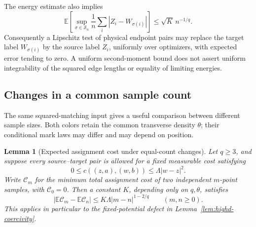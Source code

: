 \documentclass[11pt,reqno]{amsart}
\newtheorem{lemma}[theorem]{Lemma}
\theoremstyle{definition}
\theoremstyle{remark}
\numberwithin{equation}{section}
\newcommand{\E}{\mathbb E}
\begin{document}
The energy estimate also implies
\begin{equation}
\E\!\left[\sup_{\sigma\in\mathcal S_n}
 \frac1n\sum_i|Z_i-W_{\sigma(i)}|\right]
 \le\sqrt K\,n^{-1/q}.
\label{eq:highd-macro-collapse}
\end{equation}
Consequently a Lipschitz test of physical endpoint pairs may replace
the target label \(W_{\sigma(i)}\) by the source label \(Z_i\),
uniformly over optimizers, with expected error tending to zero.
A uniform second-moment bound does not assert uniform integrability
of the squared edge lengths or equality of limiting energies.

\subsection{Changes in a common sample count}
\label{subsec:highd-balanced-count}

The same squared-matching input gives a useful comparison between
different sample sizes. Both colors retain the common transverse
density \(\theta\); their conditional mark laws may differ and
may depend on position.

\begin{lemma}[Expected assignment cost under equal-count changes]
\label{lem:highd-count-continuity}
Let \(q\ge3\), and suppose every source--target pair is allowed
for a fixed measurable cost satisfying
\[
0\le c((z,a),(w,b))\le\Lambda|w-z|^2.
\]
Write \(\mathcal C_m\) for the minimum total assignment cost of
two independent \(m\)-point samples, with \(\mathcal C_0=0\).
Then a constant \(K\), depending only on \(q,\theta\), satisfies
\[
\big|\E\mathcal C_m-\E\mathcal C_n\big|
 \le K\Lambda|m-n|^{1-2/q}
\qquad(m,n\ge0).
\]
This applies in particular to the fixed-potential defect in
Lemma~\ref{lem:highd-coercivity}.
\end{lemma}
\end{document}
